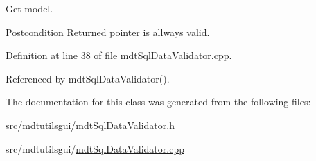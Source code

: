 Get model. 

\begin{DoxyPostcond}{Postcondition}
Returned pointer is allways valid. 
\end{DoxyPostcond}


Definition at line 38 of file mdt\-Sql\-Data\-Validator.\-cpp.



Referenced by mdt\-Sql\-Data\-Validator().



The documentation for this class was generated from the following files\-:\begin{DoxyCompactItemize}
\item 
src/mdtutilsgui/\hyperlink{mdt_sql_data_validator_8h}{mdt\-Sql\-Data\-Validator.\-h}\item 
src/mdtutilsgui/\hyperlink{mdt_sql_data_validator_8cpp}{mdt\-Sql\-Data\-Validator.\-cpp}\end{DoxyCompactItemize}
